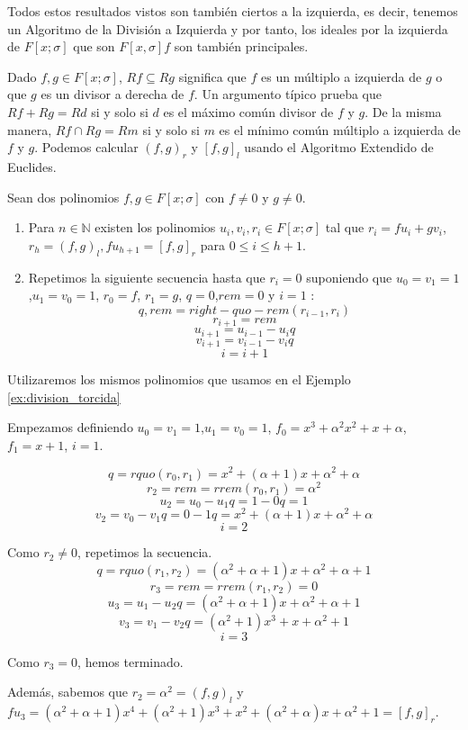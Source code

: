 \begin{remark}
    Todos estos resultados vistos son también ciertos a la izquierda, es decir, tenemos un Algoritmo de la División a Izquierda y por tanto, los ideales por la izquierda de $F[x;\sigma]$ que son $F[x,\sigma]f$ son también principales.
\end{remark}

Dado $f,g \in F[x;\sigma]$, $Rf \subseteq Rg$ significa que $f$ es un múltiplo a izquierda de $g$ o que $g$ es un divisor a derecha de $f$. Un argumento típico prueba que $Rf + Rg = Rd$ si y solo si $d$ es el máximo común divisor de $f$ y $g$. De la misma manera, $Rf \cap Rg = Rm$ si y solo si $m$ es el mínimo común múltiplo a izquierda de $f$ y $g$. Podemos calcular $(f,g)_r$ y $[f,g]_l$ usando el Algoritmo Extendido de Euclides.

\begin{theorem}
Sean dos polinomios $f,g \in F[x;\sigma]$ con $f \neq 0$ y $g \neq 0$.
    \begin{enumerate}
        \item Para $n \in \mathbb{N}$ existen los polinomios  $u_i,v_i,r_i \in F[x;\sigma]$ tal que $r_i = fu_i + gv_i$, $r_h = (f,g)_l , f u_{h+1} = [f,g]_r$ para $ 0 \leq i \leq h+1$.
    \item Repetimos la siguiente secuencia hasta que $r_{i} = 0$ suponiendo que $u_0 = v_1 = 1$,$u_1 = v_0  = 1$, $r_0 = f$, $r_1 = g$, $q = 0$,$rem = 0$ y $i = 1$ :
    \[ q,rem = right-quo-rem(r_{i-1},r_i)\]
    \[ r_{i+1} = rem \]
    \[ u_{i+1} = u_{i-1} - u_iq\]
    \[ v_{i+1} = v_{i-1} - v_iq\]
    \[ i = i + 1\]
    \end{enumerate}
    
\end{theorem}

\begin{exampleth}
    Utilizaremos los mismos polinomios que usamos en el Ejemplo \ref{ex:division_torcida}

Empezamos definiendo $u_0 = v_1 = 1$,$u_1 = v_0  = 1$, $f_0 =  x^3 + \alpha^2 x^2 + x +\alpha $, $f_1 = x + 1$, $i = 1$.

\[ q = rquo(r_0,r_1) = x^2+(\alpha+1)x+\alpha^2 + \alpha \]
\[ r_2 = rem = rrem(r_0,r_1) = \alpha^2  \]
\[ u_2 = u_0 - u_1q = 1 - 0q = 1 \]
\[ v_2 = v_0 - v_1q = 0-1q = x^2 + (\alpha + 1)x + \alpha^2 + \alpha \]
\[ i = 2\]

Como $r_2 \neq 0$, repetimos la secuencia.
\[ q = rquo(r_1,r_2) = (\alpha^2 + \alpha + 1)x + \alpha^2 + \alpha + 1\]
\[ r_3 = rem = rrem(r_1,r_2) = 0\]
\[ u_3 = u_1 - u_2q = (\alpha^2 + \alpha + 1)x + \alpha^2 + \alpha + 1 \]
\[ v_3 = v_1 - v_2q = (\alpha^2 + 1)x^3 + x + \alpha^2 + 1 \]
\[ i = 3\]

Como $r_3 = 0$, hemos terminado.

Además, sabemos que $r_2 = \alpha^2 = (f,g)_l$ y $ f u_3 = (\alpha^2 + \alpha + 1)x^4 + (\alpha^2 + 1)x^3 + x^2 + (\alpha^2 + \alpha)x + \alpha^2 + 1 = [f,g]_r$.
\end{exampleth}


